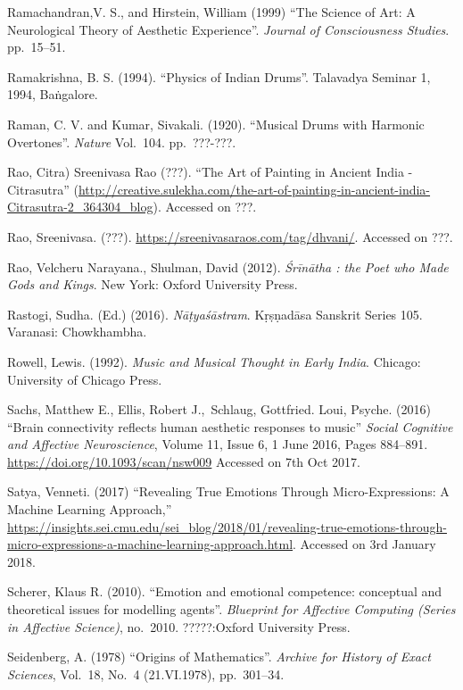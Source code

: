 \begin{thebibliography}{99}
Ramachandran,V. S., and Hirstein, William (1999) “The Science of Art: A Neurological Theory of Aesthetic Experience”. \textsl{Journal of Consciousness Studies}. pp.~15--51.

Ramakrishna, B. S. (1994). “Physics of Indian Drums”. Talavadya Seminar 1, 1994, Baṅgalore.

Raman, C. V. and Kumar, Sivakali. (1920). “Musical Drums with Harmonic Overtones”. \textsl{Nature} Vol.~104. pp.~???-???.

Rao, Citra) Sreenivasa Rao (???). “The Art of Painting in Ancient India - Citrasutra” (\url{http://creative.sulekha.com/the-art-of-painting-in-ancient-india-Citrasutra-2_364304_blog}). Accessed on ???.

Rao, Sreenivasa. (???). \url{https://sreenivasaraos.com/tag/dhvani/}. Accessed on ???.

Rao, Velcheru Narayana., Shulman, David (2012). \textsl{Śrīnātha : the Poet who Made Gods and Kings}. New York: Oxford University Press.

Rastogi, Sudha. (Ed.) (2016). \textsl{Nāṭyaśāstram}. Kṛṣṇadāsa Sanskrit Series 105. Varanasi: Chowkhambha.

Rowell, Lewis. (1992). \textsl{Music and Musical Thought in Early India}. Chicago: University of Chicago Press.

Sachs, Matthew E., Ellis, Robert J., Schlaug, Gottfried. Loui, Psyche. (2016) “Brain connectivity reflects human aesthetic responses to music” \textsl{Social Cognitive and Affective Neuroscience}, Volume 11, Issue 6, 1 June 2016, Pages 884--891. \url{https://doi.org/10.1093/scan/nsw009} Accessed on 7th Oct 2017.

Satya, Venneti. (2017) “Revealing True Emotions Through Micro-Expressions: A Machine Learning Approach,” \url{https://insights.sei.cmu.edu/sei_blog/2018/01/revealing-true-emotions-through-micro-expressions-a-machine-learning-approach.html}. Accessed on 3rd January 2018.

Scherer, Klaus R. (2010). “Emotion and emotional competence: conceptual and theoretical issues for modelling agents”. \textsl{Blueprint for Affective Computing (Series in Affective Science)}, no.~2010. ?????:Oxford University Press.

Seidenberg, A. (1978) “Origins of Mathematics”. \textsl{Archive for History of Exact Sciences}, Vol.~18, No.~4 (21.VI.1978), pp.~301--34.


\end{thebibliography}
